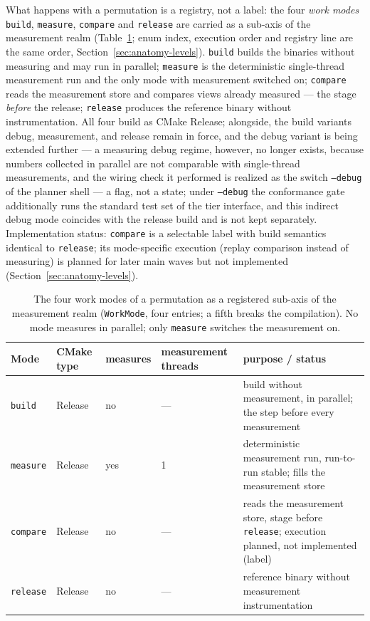 \begin{nurlang}
What happens with a permutation is a registry, not a label: the four \emph{work modes} \texttt{build},
\texttt{measure}, \texttt{compare} and \texttt{release} are carried as a sub-axis of the measurement
realm (Table~\ref{tab:work-modes}; enum index, execution order and registry line are the same order,
Section~\ref{sec:anatomy-levels}). \texttt{build} builds the binaries without measuring and may run in
parallel; \texttt{measure} is the deterministic single-thread measurement run and the only mode with
measurement switched on; \texttt{compare} reads the measurement store and compares views already
measured --- the stage \emph{before} the release; \texttt{release} produces the reference binary without
instrumentation. All four build as CMake Release; alongside, the build variants debug, measurement, and release remain in force, and the debug variant is being extended further
--- a measuring debug regime, however, no longer exists, because
numbers collected in parallel are not comparable with single-thread measurements, and the wiring check
it performed is realized as the switch \texttt{--debug} of the planner shell --- a flag, not a state;
under \texttt{--debug} the conformance gate additionally runs the standard test set of the tier interface, and this indirect debug
mode coincides with the release build and is not kept separately.
Implementation status: \texttt{compare} is a selectable label with build semantics identical to
\texttt{release}; its mode-specific execution (replay comparison instead of measuring) is planned for later main waves but
not implemented (Section~\ref{sec:anatomy-levels}).
\begin{table}[htbp]\centering\footnotesize
\begin{tabular}{@{}llllp{5.6cm}@{}}
\toprule
Mode & CMake type & measures & measurement threads & purpose / status \\
\midrule
\texttt{build}   & Release & no  & --- & build without measurement, in parallel; the step before every measurement \\
\texttt{measure} & Release & yes & 1   & deterministic measurement run, run-to-run stable; fills the measurement store \\
\texttt{compare} & Release & no  & --- & reads the measurement store, stage before \texttt{release}; execution planned, not implemented (label) \\
\texttt{release} & Release & no  & --- & reference binary without measurement instrumentation \\
\bottomrule
\end{tabular}
\caption{The four work modes of a permutation as a registered sub-axis of the measurement realm
(\texttt{WorkMode}, four entries; a fifth breaks the compilation). No mode measures in parallel; only
\texttt{measure} switches the measurement on.}\label{tab:work-modes}
\end{table}
\end{nurlang}
